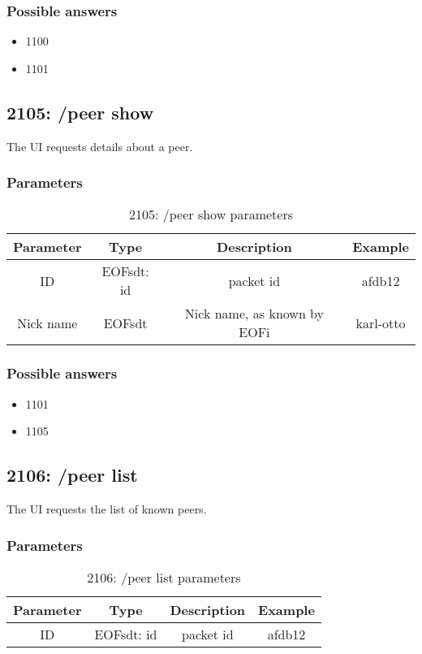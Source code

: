 \documentclass[12pt,a4paper]{book}
\begin{document}
\subsubsection{Possible answers}
\begin{itemize}
\item 1100
\item 1101
\end{itemize}

\subsection{2105: /peer show}
The UI requests details about a peer.

\subsubsection{Parameters}
\begin{longtable}{|c|c|c|c|}
\caption{2105: /peer show parameters}\\
\hline
\textbf{Parameter} & \textbf{Type} & \textbf{Description} & \textbf{Example}\\
\hline
ID & EOFsdt: id & packet id & afdb12\\
\hline
Nick name & EOFsdt & Nick name, as known by EOFi & karl-otto\\
\hline
\end{longtable}

\subsubsection{Possible answers}
\begin{itemize}
\item 1101
\item 1105
\end{itemize}
\subsection{2106: /peer list}
The UI requests the list of known peers.

\subsubsection{Parameters}
\begin{longtable}{|c|c|c|c|}
\caption{2106: /peer list parameters}\\
\hline
\textbf{Parameter} & \textbf{Type} & \textbf{Description} & \textbf{Example}\\
\hline
ID & EOFsdt: id & packet id & afdb12\\
\hline
\end{longtable}
\end{document}
